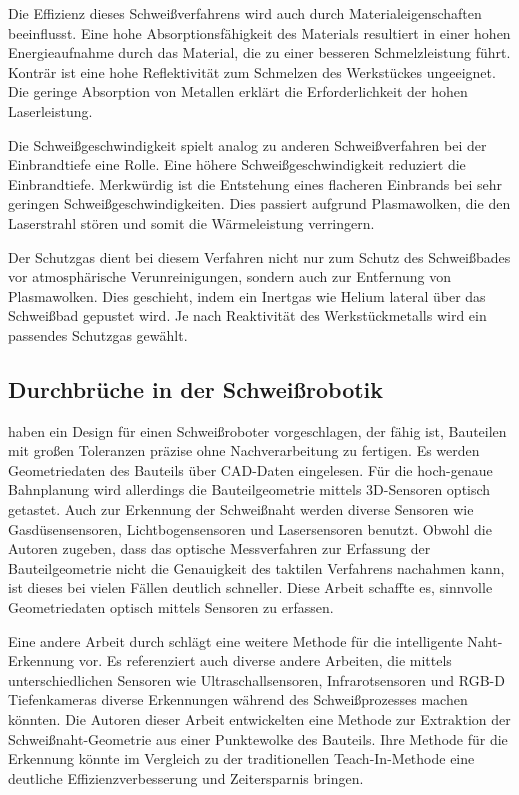 Die Effizienz dieses Schweißverfahrens wird auch durch Materialeigenschaften beeinflusst. Eine hohe Absorptionsfähigkeit des Materials resultiert in einer hohen Energieaufnahme durch das Material, die zu einer besseren Schmelzleistung führt. Konträr ist eine hohe Reflektivität zum Schmelzen des Werkstückes ungeeignet. Die geringe Absorption von Metallen erklärt die Erforderlichkeit der hohen Laserleistung. \autocite[52-53]{Pires_WeldingRobots_2006}

Die Schweißgeschwindigkeit spielt analog zu anderen Schweißverfahren bei der Einbrandtiefe eine Rolle. Eine höhere Schweißgeschwindigkeit reduziert die Einbrandtiefe. Merkwürdig ist die Entstehung eines flacheren Einbrands bei sehr geringen Schweißgeschwindigkeiten. Dies passiert aufgrund Plasmawolken, die den Laserstrahl stören und somit die Wärmeleistung verringern. \autocite[51]{Pires_WeldingRobots_2006}

Der Schutzgas dient bei diesem Verfahren nicht nur zum Schutz des Schweißbades vor atmosphärische Verunreinigungen, sondern auch zur Entfernung von Plasmawolken. Dies geschieht, indem ein Inertgas wie Helium lateral über das Schweißbad gepustet wird. Je nach Reaktivität des Werkstückmetalls wird ein passendes Schutzgas gewählt. \autocite[52]{Pires_WeldingRobots_2006}

\subsection{Durchbrüche in der Schweißrobotik}

\textcite{Wilmsmeyer_2018} haben ein Design für einen Schweißroboter vorgeschlagen, der fähig ist, Bauteilen mit großen Toleranzen präzise ohne Nachverarbeitung zu fertigen. Es werden Geometriedaten des Bauteils über CAD-Daten eingelesen. Für die hoch-genaue Bahnplanung wird allerdings die Bauteilgeometrie mittels 3D-Sensoren optisch getastet. Auch zur Erkennung der Schweißnaht werden diverse Sensoren wie Gasdüsensensoren, Lichtbogensensoren und Lasersensoren benutzt. Obwohl die Autoren zugeben, dass das optische Messverfahren zur Erfassung der Bauteilgeometrie nicht die Genauigkeit des taktilen Verfahrens nachahmen kann, ist dieses bei vielen Fällen deutlich schneller. Diese Arbeit schaffte es, sinnvolle Geometriedaten optisch mittels Sensoren zu erfassen.

Eine andere Arbeit durch \textcite{Yang_2019} schlägt eine weitere Methode für die intelligente Naht-Erkennung vor. Es referenziert auch diverse andere Arbeiten, die mittels unterschiedlichen Sensoren wie Ultraschallsensoren, Infrarotsensoren und RGB-D Tiefenkameras diverse Erkennungen während des Schweißprozesses machen könnten. Die Autoren dieser Arbeit entwickelten eine Methode zur Extraktion der Schweißnaht-Geometrie aus einer Punktewolke des Bauteils. Ihre Methode für die Erkennung könnte im Vergleich zu der traditionellen Teach-In-Methode eine deutliche Effizienzverbesserung und Zeitersparnis bringen. 

